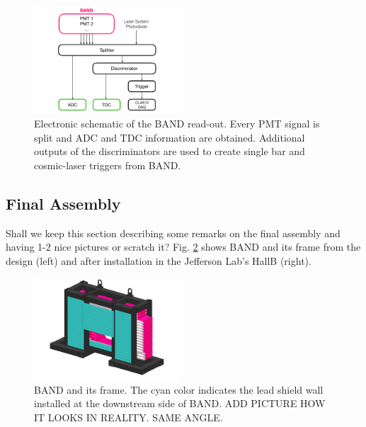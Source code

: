 \documentclass[3p,final,twocolumn]{elsarticle}
\begin{document}
\begin{figure}[tbh!]
	\centering
		\includegraphics[width=0.48\textwidth]{figures/electronics-diag.pdf}
	\caption{Electronic schematic of the BAND read-out. Every PMT signal is split and ADC and TDC information are obtained. Additional outputs of the discriminators are used to create single bar and cosmic-laser triggers from BAND.}
	\label{fig:electronic-diag}
\end{figure}


\subsection{Final Assembly}
{\color{red} Shall we keep this section describing some remarks on the final assembly and having 1-2 nice pictures or scratch it?}
Fig. \ref{fig:band} shows BAND and its frame from the design (left) and after installation in the Jefferson Lab's HallB (right).
\begin{figure}[th]
	\centering
	\includegraphics[width=0.48\textwidth]{BAND_1-2.png}
		\caption{BAND and its frame. The cyan color indicates the lead shield wall installed at the downstream side of BAND. ADD PICTURE HOW IT LOOKS IN REALITY. SAME ANGLE.}
		\label{fig:band}
\end{figure}
\end{document}
